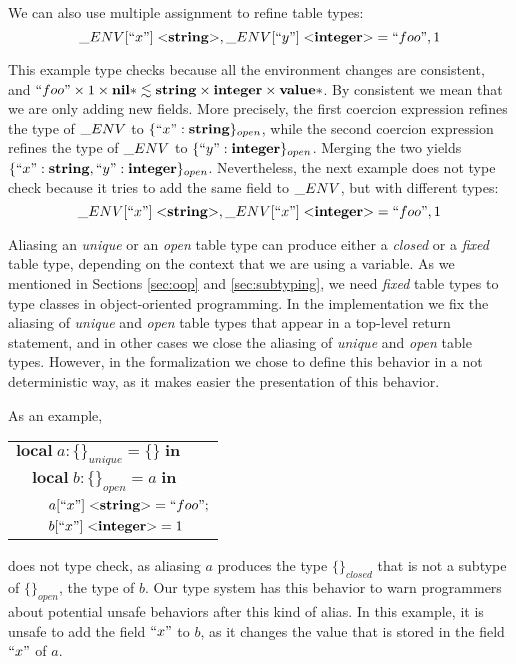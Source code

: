 We can also use multiple assignment to refine table types:
\[
\string_ENV[``x"] \; {<}\String{>}, \string_ENV[``y"] \; {<}\Integer{>} = ``foo", 1
\]

This example type checks because all the environment changes are consistent, and
$``foo" \times 1 \times \mathbf{nil}{*} \lesssim \mathbf{string} \times \mathbf{integer} \times \mathbf{value}{*}$.
By consistent we mean that we are only adding new fields.
More precisely, the first coercion expression refines the type of $\string_ENV$
to $\{``x":\mathbf{string}\}_{open}$, while
the second coercion expression refines the type of $\string_ENV$
to $\{``y":\mathbf{integer}\}_{open}$.
Merging the two yields $\{``x":\mathbf{string}, ``y":\mathbf{integer}\}_{open}$.
Nevertheless, the next example does not type check because it tries to add
the same field to $\string_ENV$, but with different types:
\[
\string_ENV[``x"] \; {<}\String{>}, \string_ENV[``x"] \; {<}\Integer{>} = ``foo", 1
\]

Aliasing an \emph{unique} or an \emph{open} table type can produce
either a \emph{closed} or a \emph{fixed} table type, depending on
the context that we are using a variable.
As we mentioned in Sections \ref{sec:oop} and \ref{sec:subtyping},
we need \emph{fixed} table types to type classes in object-oriented programming.
In the implementation we fix the aliasing of \emph{unique} and \emph{open}
table types that appear in a top-level return statement, and in other cases we
close the aliasing of \emph{unique} and \emph{open} table types.
However, in the formalization we chose to define this behavior in
a not deterministic way, as it makes easier the presentation of this behavior.

As an example,
\begin{center}
\begin{tabular}{lll}
\multicolumn{3}{l}{$\mathbf{local} \; a:\{\}_{unique} = \{\} \; \mathbf{in}$}\\
& \multicolumn{2}{l}{$\mathbf{local} \; b:\{\}_{open} = a \; \mathbf{in}$}\\
& & \multicolumn{1}{l}{$a[``x"] \; {<}\mathbf{string}{>} = ``foo";$}\\
& & \multicolumn{1}{l}{$b[``x"] \; {<}\mathbf{integer}{>} = 1$}\\
\end{tabular}
\end{center}
does not type check, as aliasing $a$ produces the type $\{\}_{closed}$
that is not a subtype of $\{\}_{open}$, the type of $b$.
Our type system has this behavior to warn programmers about
potential unsafe behaviors after this kind of alias.
In this example, it is unsafe to add the field $``x"$ to $b$,
as it changes the value that is stored in the field $``x"$ of $a$.

